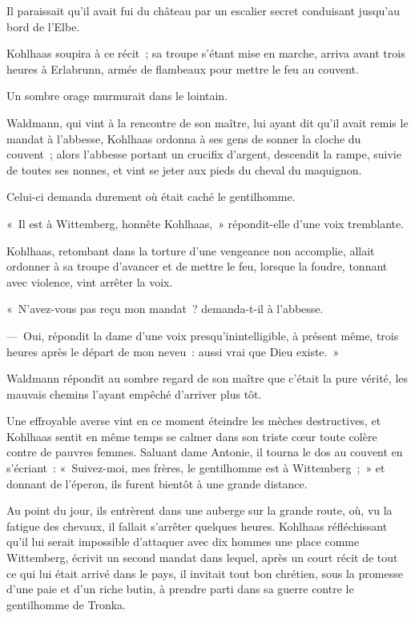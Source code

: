 \documentclass[french,twoside]{book} %
\begin{document}
Il paraissait qu’il avait fui du château par un escalier secret conduisant jusqu’au bord de l’Elbe.\par
Kohlhaas soupira à ce récit ; sa troupe s’étant mise en marche, arriva avant trois heures à Erlabrunn, armée de flambeaux pour mettre le feu au couvent.\par
Un sombre orage murmurait dans le lointain.\par
Waldmann, qui vint à la rencontre de son maître, lui ayant dit qu’il avait remis le mandat à l’abbesse, Kohlhaas ordonna à ses gens de sonner la cloche du couvent ; alors l’abbesse portant un crucifix d’argent, descendit la rampe, suivie de toutes ses nonnes, et vint se jeter aux pieds du cheval du maquignon.\par
Celui-ci demanda durement où était caché le gentilhomme.\par
« Il est à Wittemberg, honnête Kohlhaas, » répondit-elle d’une voix tremblante.\par
Kohlhaas, retombant dans la torture d’une vengeance non accomplie, allait ordonner à sa troupe d’avancer et de mettre le feu, lorsque la foudre, tonnant avec violence, vint arrêter la voix.\par
« N’avez-vous pas reçu mon mandat ? demanda-t-il à l’abbesse.\par
— Oui, répondit la dame d’une voix presqu’inintelligible, à présent même, trois heures après le départ de mon neveu : aussi vrai que Dieu existe. »\par
Waldmann répondit au sombre regard de son maître que c’était la pure vérité, les mauvais chemins l’ayant empêché d’arriver plus tôt.\par
Une effroyable averse vint en ce moment éteindre les mèches destructives, et Kohlhaas sentit en même temps se calmer dans son triste cœur toute colère contre de pauvres femmes. Saluant dame Antonie, il tourna le dos au couvent en s’écriant : « Suivez-moi, mes frères, le gentilhomme est à Wittemberg ; » et donnant de l’éperon, ils furent bientôt à une grande distance.\par
Au point du jour, ils entrèrent dans une auberge sur la grande route, où, vu la fatigue des chevaux, il fallait s’arrêter quelques heures. Kohlhaas réfléchissant qu’il lui serait impossible d’attaquer avec dix hommes une place comme Wittemberg, écrivit un second mandat dans lequel, après un court récit de tout ce qui lui était arrivé dans le pays, il invitait tout bon chrétien, sous la promesse d’une paie et d’un riche butin, à prendre parti dans sa guerre contre le gentilhomme de Tronka.\par
\end{document}
